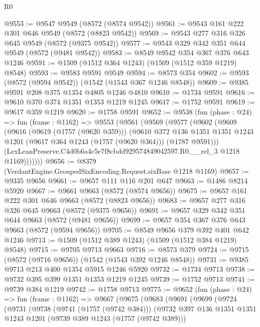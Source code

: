 \begin{lexlean}{R0}
\begin{coremodule}
@9553 := @9547 @9549 (@8572 (@8574 @9542))
@9561 := @9543 @161 @222 @301 @646 @9549 (@8572 (@8823 @9542))
@9569 := @9543 @277 @316 @326 @645 @9549 (@8572 (@9375 @9542))
@9577 := @9543 @329 @342 @351 @644 @9549 (@8572 (@9481 @9542))
@9583 := @8549 @9542 @354 @367 @376 @643 @1246
@9591 := @1509 (@1512 @364 @1243) (@1509 (@1512 @359 @1219) @8548)
@9593 := @9583 @9591 @9549
@9594 := @8573 @354
@9602 := @9593 (@8572 (@9594 @9542)) (@1542 (@1543 @367 @1246 @8548))
@9609 := @9385 @9591 @208 @375 @1354 @4805 @1246 @4810
@9610 := @1734 @9591
@9616 := @9610 @370 @374 @1351 @1353 @1219 @1245
@9617 := @1752 @9591
@9619 := @9617 @359 @1219
@9620 := @1758 @9591
@9652 := @9538
    (fun (phase : @24) =>
    fun (frame : @1162) =>
    @9553
      (@9561
        (@9569
          (@9577
            (@9602
              (@9609
                (@9616
                  (@9619 (@1757 (@9620 @359)))
                  (@9610
                    @372
                    @136
                    @1351
                    @1351
                    @1243
                    @1201
                    (@9617 @364 @1243 (@1757 (@9620 @364)))
                    (@1787 @9591)))
                (LexLeanPreserve.C4d0b6a4c5e7f8cbdd929574849042597.R0.__rel_3 @1218 @1169)))))))
@9656 := @8379 (VerdantEngine.GroupedSixEncoding.Request.sixBase @1218 @1169)
@9657 := @9335 @9656
@9661 := @9657 @111 @116 @201 @647
@9663 := @1486 @8214 @5920
@9667 := @9661 @9663 (@8572 (@8574 @9656))
@9675 := @9657 @161 @222 @301 @646 @9663 (@8572 (@8823 @9656))
@9683 := @9657 @277 @316 @326 @645 @9663 (@8572 (@9375 @9656))
@9691 := @9657 @329 @342 @351 @644 @9663 (@8572 (@9481 @9656))
@9699 := @9657 @354 @367 @376 @643 @9663 (@8572 (@9594 @9656))
@9705 := @8549 @9656 @379 @392 @401 @642 @1246
@9713 := @1509 (@1512 @389 @1243) (@1509 (@1512 @384 @1219) @8548)
@9715 := @9705 @9713 @9663
@9716 := @8573 @379
@9724 := @9715 (@8572 (@9716 @9656)) (@1542 (@1543 @392 @1246 @8548))
@9731 := @9385 @9713 @213 @400 @1354 @5915 @1246 @5920
@9732 := @1734 @9713
@9738 := @9732 @395 @399 @1351 @1353 @1219 @1245
@9739 := @1752 @9713
@9741 := @9739 @384 @1219
@9742 := @1758 @9713
@9775 := @9652
    (fun (phase : @24) =>
    fun (frame : @1162) =>
    @9667
      (@9675
        (@9683
          (@9691
            (@9699
              (@9724
                (@9731
                  (@9738
                    (@9741 (@1757 (@9742 @384)))
                    (@9732
                      @397
                      @136
                      @1351
                      @1351
                      @1243
                      @1201
                      (@9739 @389 @1243 (@1757 (@9742 @389)))

\end{coremodule}
\end{lexlean}
